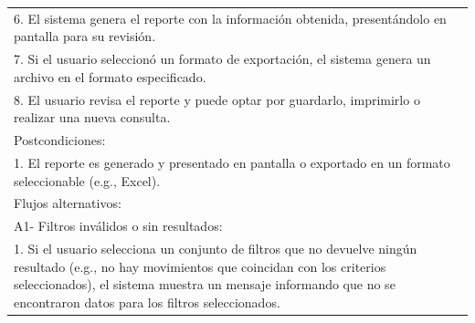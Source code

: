 \documentclass[stu, 12pt, letterpaper, donotrepeattitle, floatsintext, natbib]{apa7}
\begin{document}
\begin{longtable}{@{} p{16.5cm} @{}}
    6. El sistema genera el reporte con la información obtenida, presentándolo en pantalla para su revisión.                                                                                                                                                                       \\
    7. Si el usuario seleccionó un formato de exportación, el sistema genera un archivo en el formato especificado.                                                                                                                                                                \\
    8. El usuario revisa el reporte y puede optar por guardarlo, imprimirlo o realizar una nueva consulta.                                                                                                                                                                         \\ \midrule
    Postcondiciones:                                                                                                                                                                                                                                                               \\
    1. El reporte es generado y presentado en pantalla o exportado en un formato seleccionable (e.g., Excel).                                                                                                                                                                      \\ \midrule
    Flujos alternativos:                                                                                                                                                                                                                                                           \\
    A1- Filtros inválidos o sin resultados:                                                                                                                                                                                                                                        \\
    \hspace{1cm}1. Si el usuario selecciona un conjunto de filtros que no devuelve ningún resultado (e.g., no hay movimientos que coincidan con los criterios seleccionados), el sistema muestra un mensaje informando que no se encontraron datos para los filtros seleccionados. \\

\end{longtable}
\end{document}
